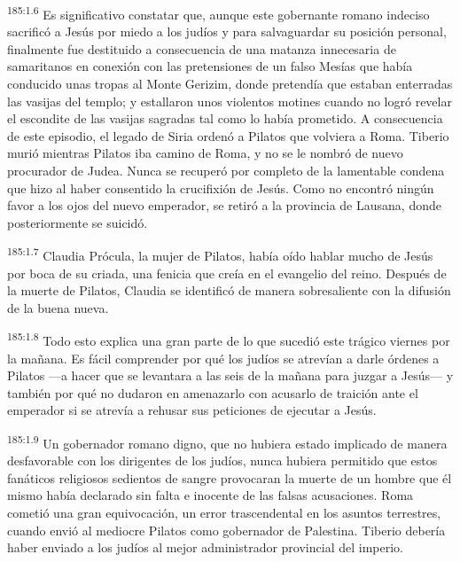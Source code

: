 \par
\textsuperscript{185:1.6} Es significativo constatar que, aunque este gobernante romano indeciso sacrificó a Jesús por miedo a los judíos y para salvaguardar su posición personal, finalmente fue destituido a consecuencia de una matanza innecesaria de samaritanos en conexión con las pretensiones de un falso Mesías que había conducido unas tropas al Monte Gerizim, donde pretendía que estaban enterradas las vasijas del templo; y estallaron unos violentos motines cuando no logró revelar el escondite de las vasijas sagradas tal como lo había prometido. A consecuencia de este episodio, el legado de Siria ordenó a Pilatos que volviera a Roma. Tiberio murió mientras Pilatos iba camino de Roma, y no se le nombró de nuevo procurador de Judea. Nunca se recuperó por completo de la lamentable condena que hizo al haber consentido la crucifixión de Jesús. Como no encontró ningún favor a los ojos del nuevo emperador, se retiró a la provincia de Lausana, donde posteriormente se suicidó.

\par
\textsuperscript{185:1.7} Claudia Prócula, la mujer de Pilatos, había oído hablar mucho de Jesús por boca de su criada, una fenicia que creía en el evangelio del reino. Después de la muerte de Pilatos, Claudia se identificó de manera sobresaliente con la difusión de la buena nueva.

\par
\textsuperscript{185:1.8} Todo esto explica una gran parte de lo que sucedió este trágico viernes por la mañana. Es fácil comprender por qué los judíos se atrevían a darle órdenes a Pilatos ---a hacer que se levantara a las seis de la mañana para juzgar a Jesús--- y también por qué no dudaron en amenazarlo con acusarlo de traición ante el emperador si se atrevía a rehusar sus peticiones de ejecutar a Jesús.

\par
\textsuperscript{185:1.9} Un gobernador romano digno, que no hubiera estado implicado de manera desfavorable con los dirigentes de los judíos, nunca hubiera permitido que estos fanáticos religiosos sedientos de sangre provocaran la muerte de un hombre que él mismo había declarado sin falta e inocente de las falsas acusaciones. Roma cometió una gran equivocación, un error trascendental en los asuntos terrestres, cuando envió al mediocre Pilatos como gobernador de Palestina. Tiberio debería haber enviado a los judíos al mejor administrador provincial del imperio.

